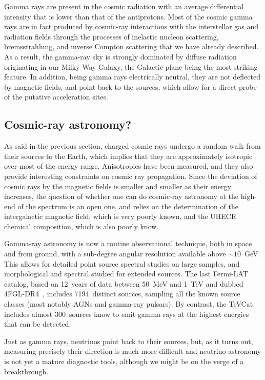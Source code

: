 Gamma rays are present in the cosmic radiation with an average differential
intensity that is lower than that of the antiprotons. Most of the cosmic gamma rays
are in fact produced by cosmic-ray interactions with the interstellar gas and radiation
fields through the processes of inelastic nucleon scattering, bremsstrahlung, and
inverse Compton scattering that we have already described. As a result, the gamma-ray
sky is strongly dominated by diffuse radiation originating in our Milky Way Galaxy,
the Galactic plane being the most striking feature. In addition, being gamma rays
electrically neutral, they are not deflected by magnetic fields, and point back
to the sources, which allow for a direct probe of the putative acceleration sites.


\subsection{Cosmic-ray astronomy?}

As said in the previous section, charged cosmic rays undergo a random walk from
their sources to the Earth, which implies that they are approximately isotropic
over most of the energy range. Anisotropies have been measured, and they also
provide interesting constraints on cosmic ray propagation. Since the deviation of
cosmic rays by the magnetic fields is smaller and smaller as their energy increases,
the question of whether one can do cosmic-ray astronomy at the high-end of the
spectrum is an open one, and relies on the determination of the intergalactic
magnetic field, which is very poorly known, and the UHECR chemical composition,
which is also poorly know.

Gamma-ray astronomy is now a routine observational technique, both in space and
from ground, with a sub-degree angular resolution available above $\sim 10$~GeV.
This allows for detailed point source spectral studies on large samples, and
morphological and spectral studied for extended sources. The last Fermi-LAT
catalog, based on 12~years of data between 50~MeV and 1~TeV and dubbed
4FGL-DR4~\cite{2023arXiv230712546B}, includes 7194~distinct sources,
sampling all the known source classes (most notably AGNs and gamma-ray pulsars).
By contrast, the TeVCat includes almost 300~sources know to emit gamma rays at the
highest energies that can be detected.

Just as gamma rays, neutrinos point back to their sources, but, as it turns out,
measuring precisely their direction is much more difficult and neutrino astronomy
is not yet a mature diagnostic tools, although we might be on the verge of a
breakthrough.


